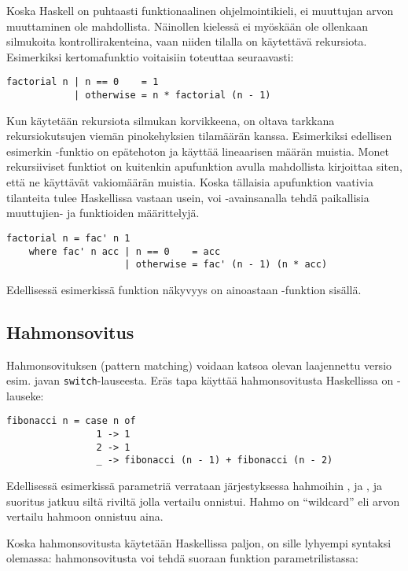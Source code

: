 Koska Haskell on puhtaasti funktionaalinen ohjelmointikieli,
ei muuttujan arvon muuttaminen ole mahdollista.
Näinollen kielessä ei myöskään ole ollenkaan silmukoita kontrollirakenteina,
vaan niiden tilalla on käytettävä rekursiota.
Esimerkiksi kertomafunktio voitaisiin toteuttaa seuraavasti:

\begin{verbatim}
factorial n | n == 0    = 1
            | otherwise = n * factorial (n - 1)
\end{verbatim}

Kun käytetään rekursiota silmukan korvikkeena,
on oltava tarkkana rekursiokutsujen viemän pinokehyksien tilamäärän kanssa.
Esimerkiksi edellisen esimerkin -funktio on epätehoton ja käyttää lineaarisen määrän muistia.
Monet rekursiiviset funktiot on kuitenkin apufunktion avulla mahdollista kirjoittaa siten,
että ne käyttävät vakiomäärän muistia.
Koska tällaisia apufunktion vaativia tilanteita tulee Haskellissa vastaan usein,
voi -avainsanalla tehdä paikallisia muuttujien- ja funktioiden määrittelyjä.

\begin{verbatim}
factorial n = fac' n 1
    where fac' n acc | n == 0    = acc
                     | otherwise = fac' (n - 1) (n * acc)
\end{verbatim}

Edellisessä esimerkissä funktion  näkyvyys on ainoastaan -funktion sisällä.

\subsection{Hahmonsovitus}
Hahmonsovituksen (pattern matching) voidaan katsoa olevan laajennettu versio esim. javan \texttt{switch}-lauseesta.
Eräs tapa käyttää hahmonsovitusta Haskellissa on -lauseke:
\begin{verbatim}
fibonacci n = case n of
                1 -> 1
                2 -> 1
                _ -> fibonacci (n - 1) + fibonacci (n - 2)
\end{verbatim}
Edellisessä esimerkissä parametriä  verrataan järjestyksessa hahmoihin ,  ja \Haskell{\_},
ja suoritus jatkuu siltä riviltä jolla vertailu onnistui.
Hahmo \Haskell{\_} on ``wildcard'' eli arvon vertailu hahmoon onnistuu aina.

Koska hahmonsovitusta käytetään Haskellissa paljon, on sille lyhyempi syntaksi olemassa:
hahmonsovitusta voi tehdä suoraan funktion parametrilistassa:

